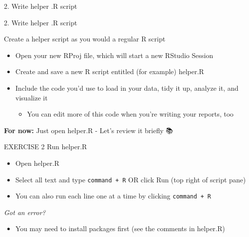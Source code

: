 \documentclass[
  ignorenonframetext,
]{beamer}
\providecommand{\tightlist}{%
  \setlength{\itemsep}{0pt}\setlength{\parskip}{0pt}}
\begin{document}
\begin{frame}[fragile]{2. Write helper .R script}
\protect\hypertarget{write-helper-.r-script}{}

\begin{block}{2. Write helper .R script}

\begin{block}{Create a helper script as you would a regular R script}

\begin{itemize}
\tightlist
\item
  Open your new RProj file, which will start a new RStudio Session
\item
  Create and save a new R script entitled (for example) helper.R
\item
  Include the code you'd use to load in your data, tidy it up, analyze
  it, and visualize it

  \begin{itemize}
  \tightlist
  \item
    You can edit more of this code when you're writing your reports, too
  \end{itemize}
\end{itemize}

\textbf{For now:} Just open helper.R - Let's review it briefly 📚

\end{block}

\end{block}

\begin{block}{EXERCISE 2 \textbar{} Run helper.R}

\begin{itemize}
\tightlist
\item
  Open helper.R
\item
  Select all text and type \texttt{command\ +\ R} OR click Run (top
  right of script pane)
\item
  You can also run each line one at a time by clicking
  \texttt{command\ +\ R}
\end{itemize}

\emph{Got an error?}

\begin{itemize}
\tightlist
\item
  You may need to install packages first (see the comments in helper.R)
\end{itemize}

\end{block}


\end{frame}
\end{document}
